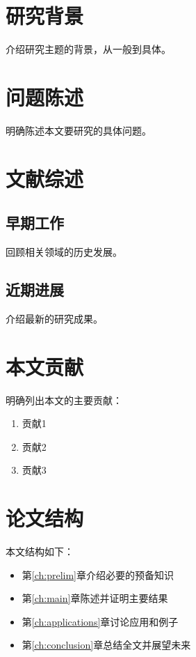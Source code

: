 \documentclass[12pt,a4paper]{report}
\theoremstyle{definition}
\begin{document}
\section{研究背景}

介绍研究主题的背景，从一般到具体。

\section{问题陈述}

明确陈述本文要研究的具体问题。

\section{文献综述}

\subsection{早期工作}

回顾相关领域的历史发展。

\subsection{近期进展}

介绍最新的研究成果。

\section{本文贡献}

明确列出本文的主要贡献：
\begin{enumerate}
    \item 贡献1
    \item 贡献2
    \item 贡献3
\end{enumerate}

\section{论文结构}

本文结构如下：
\begin{itemize}
    \item 第\ref{ch:prelim}章介绍必要的预备知识
    \item 第\ref{ch:main}章陈述并证明主要结果
    \item 第\ref{ch:applications}章讨论应用和例子
    \item 第\ref{ch:conclusion}章总结全文并展望未来
\end{itemize}
\end{document}
